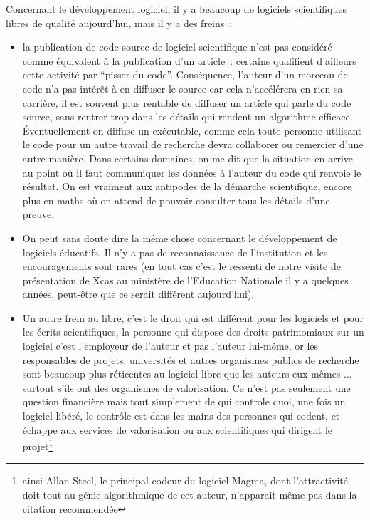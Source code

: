 \documentclass[a4paper,11pt]{article}
\begin{document}
Concernant le d\`eveloppement logiciel,
il y a beaucoup de logiciels scientifiques libres de qualit\'e aujourd'hui, mais
il y a des freins~:
\begin{itemize}
\item la publication de code source de logiciel scientifique n'est pas
consid\'er\'e comme \'equivalent \`a la publication d'un article~:
certains qualifient d'ailleurs cette activit\'e par ``pisser du
code''. 
Cons\'equence, l'auteur d'un morceau de code n'a pas int\'er\^et
\`a en diffuser le source car cela n'acc\'el\'erera en rien
sa carri\`ere, il est souvent plus rentable
de diffuser un article qui parle du code source,
sans rentrer trop dans les
d\'etails qui rendent un algorithme efficace. \'Eventuellement
on diffuse un ex\'ecutable,
comme cela toute personne utilisant le code pour un autre
travail de recherche devra collaborer
ou remercier d'une autre mani\`ere. Dans certains
domaines, on me dit que la situation en arrive au point
o\`u il faut communiquer
les donn\'ees \`a l'auteur du code qui renvoie le r\'esultat.
On est vraiment aux antipodes de la d\'emarche scientifique,
encore plus en maths o\`u on attend de pouvoir consulter
tous les d\'etails d'une preuve.
\item On peut sans doute dire la m\^eme chose concernant
le d\'eveloppement de logiciels
\'educatifs. Il n'y a pas de reconnaissance de l'institution et
les encouragements sont rares (en tout cas c'est le ressenti
de notre visite de pr\'esentation de Xcas
au minist\`ere de l'Education Nationale
il y a quelques ann\'ees, peut-\^etre que ce serait diff\'erent
aujourd'hui).
\item Un autre frein au libre, c'est le droit qui est diff\'erent pour les logiciels
et pour les \'ecrits scientifiques, la personne qui dispose des droits
patrimomiaux sur un logiciel c'est l'employeur de l'auteur et
pas l'auteur lui-m\^eme, or les responsables de projets,
universit\'es et autres organismes
publics de recherche sont beaucoup plus r\'eticentes au logiciel
libre que les auteurs eux-m\^emes ... surtout s'ils ont des organismes
de valorisation. Ce n'est pas seulement une question financi\`ere
mais tout simplement de qui controle quoi, une fois un logiciel
lib\'er\'e, le contr\^ole est dans les mains des personnes qui codent,
et \'echappe aux services de valorisation ou aux scientifiques
qui dirigent le projet\footnote{ainsi Allan Steel, le principal codeur du logiciel 
Magma, dont l'attractivit\'e doit tout au g\'enie algorithmique de cet
auteur, n'apparait m\^eme pas dans la citation recommend\'ee
}
\end{itemize}
\end{document}
